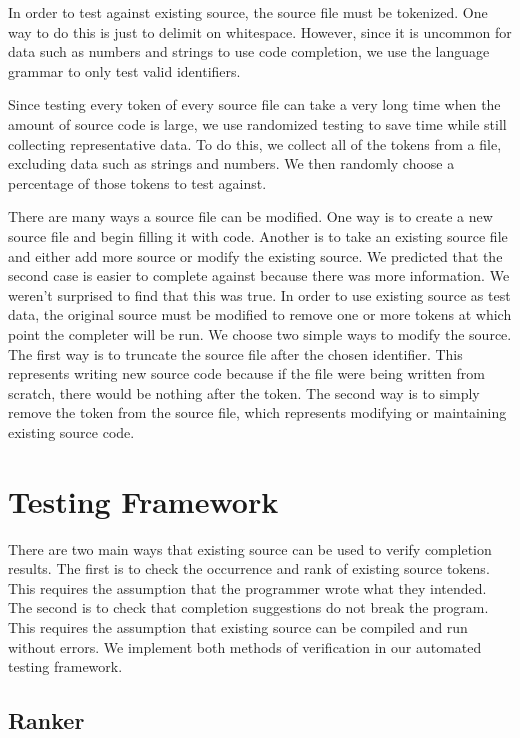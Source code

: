 \documentclass[ms,electronic,twosidetoc,letterpaper,chaptercenter,parttop,lol,lof,lot]{byumsphd}
\begin{document}
In order to test against existing source, the source file must be tokenized.
One way to do this is just to delimit on whitespace.
However, since it is uncommon for data such as numbers and strings to use code completion, we use the language grammar to only test valid identifiers.

Since testing every token of every source file can take a very long time when the amount of source code is large, we use randomized testing to save time while still collecting representative data.
To do this, we collect all of the tokens from a file, excluding data such as strings and numbers. 
We then randomly choose a percentage of those tokens to test against.

There are many ways a source file can be modified.
One way is to create a new source file and begin filling it with code.
Another is to take an existing source file and either add more source or modify the existing source.
We predicted that the second case is easier to complete against because there was more information.
We weren't surprised to find that this was true.
In order to use existing source as test data, the original source must be modified to remove one or more tokens at which point the completer will be run.
We choose two simple ways to modify the source.
The first way is to truncate the source file after the chosen identifier.
This represents writing new source code because if the file were being written from scratch, there would be nothing after the token.
The second way is to simply remove the token from the source file, which represents modifying or maintaining existing source code.

\section{Testing Framework}

There are two main ways that existing source can be used to verify completion results.
The first is to check the occurrence and rank of existing source tokens.
This requires the assumption that the programmer wrote what they intended.
The second is to check that completion suggestions do not break the program.
This requires the assumption that existing source can be compiled and run without errors.
We implement both methods of verification in our automated testing framework.

\subsection*{Ranker}
\end{document}
